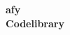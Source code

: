 \documentclass[9pt,landscape]{article}
\begin{document}
\thispagestyle{empty}
\null\vfill
\begin{center}
  \Huge \textbf{afy \\ Codelibrary}

  \vspace{1.5cm}

\end{center}
\vfill
\clearpage

\begin{multicols}{2}
  \tableofcontents
\end{multicols}

\newpage

\columnseprule=0.25pt

\begin{multicols}{2}
  
\end{multicols}
\end{document}
